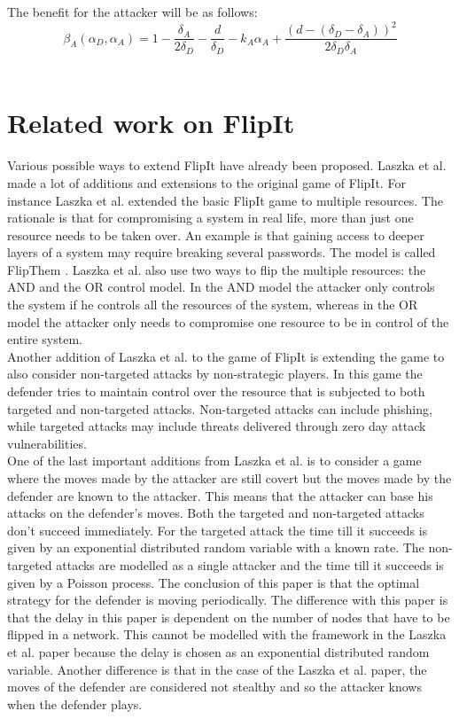 \documentclass[journal,a4paper]{IEEEtran}
\begin{document}
The benefit for the attacker will be as follows:
\begin{equation}\label{first}
\beta_{A}(\alpha_{D},\alpha_{A}) = 1 -\dfrac{\delta_{A}}{2\delta_{D}} - \dfrac{d}{\delta_{D}} - k_{A} \alpha_{A} + \dfrac{(d - (\delta_{D} - \delta_{A}))^{2}}{2 \delta_{D} \delta_{A}}
\end{equation}\\


\section{Related work on FlipIt}
\label{ch:extendedWork}

Various possible ways to extend FlipIt have already been proposed. 
Laszka et al. made a lot of additions and extensions to the original game of FlipIt. For instance Laszka et al. extended the basic FlipIt game to multiple resources. The rationale is that for compromising a system in real life, more than just one resource needs to be taken over. An example is that gaining access to deeper layers of a system may require breaking several passwords. The model is called FlipThem \cite{FlipThem}. Laszka et al. also use two ways to flip the multiple resources: the AND and the OR control model. In the AND model the attacker only controls the system if he controls all the resources of the system, whereas in the OR model the attacker only needs to compromise one resource to be in control of the entire system. \\

Another addition of Laszka et al. to the game of FlipIt \cite{MitigationCovert} 
is extending the game to also consider non-targeted attacks by non-strategic players. In this game the defender tries to maintain control over the resource that is subjected to both targeted and non-targeted attacks. Non-targeted attacks can include phishing, while targeted attacks may include threats delivered through zero day attack vulnerabilities. \\
One of the last important additions from Laszka et al. \cite{MitigationNonTargeted} is to consider a game where the moves made by the attacker are still covert but the moves made by the defender are known to the attacker. This means that the attacker can base his attacks on the defender's moves. Both the targeted and non-targeted attacks don't succeed immediately. For the targeted attack the time till it succeeds is given by an exponential distributed random variable with a known rate. The non-targeted attacks are modelled as a single attacker and the time till it succeeds is given by a Poisson process. The conclusion of this paper is that the optimal strategy for the defender is moving periodically. The difference with this paper is that the delay in this paper is dependent on the number of nodes that have to be flipped in a network. This cannot be modelled with the framework in the Laszka et al. paper because the delay is chosen as an exponential distributed random variable. Another difference is that in the case of the Laszka et al. paper, the moves of the defender are considered not stealthy and so the attacker knows when the defender plays. \\ 
\end{document}

